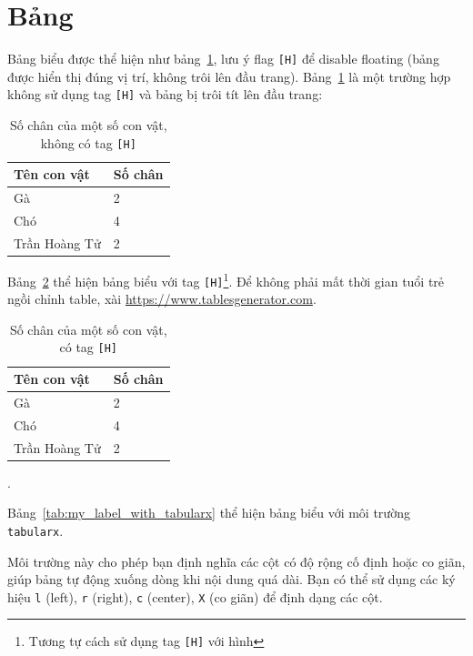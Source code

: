 \section{Bảng}
Bảng biểu được thể hiện như bảng~\ref{tab:my_label}, lưu ý flag \texttt{[H]} để disable floating (bảng được hiển thị đúng vị trí, không trôi lên đầu trang). Bảng~\ref{tab:my_label} là một trường hợp không sử dụng tag \texttt{[H]} và bảng bị trôi tít lên đầu trang:
\begin{table}[H]
	\centering
	\begin{tabular}{|l|l|}
		\hline
		\textbf{Tên con vật} & \textbf{Số chân} \\ \hline
		Gà                   & 2                \\ \hline
		Chó                  & 4                \\ \hline
		Trần Hoàng Tử        & 2                \\ \hline
	\end{tabular}
	\caption{Số chân của một số con vật, không có tag \texttt{[H]}}
	\label{tab:my_label}
\end{table}

Bảng~\ref{tab:my_label_with_H_tag} thể hiện bảng biểu với tag \texttt{[H]}\footnote{Tương tự cách sử dụng tag \texttt{[H]} với hình}. Để không phải mất thời gian tuổi trẻ ngồi chỉnh table, xài \href{https://www.tablesgenerator.com}{https://www.tablesgenerator.com}.

\begin{table}[H]
	\centering
	\begin{tabular}{|l|l|}
		\hline
		\textbf{Tên con vật} & \textbf{Số chân} \\ \hline
		Gà                   & 2                \\ \hline
		Chó                  & 4                \\ \hline
		Trần Hoàng Tử        & 2                \\ \hline
	\end{tabular}
	\caption{Số chân của một số con vật, có tag \texttt{[H]}}
	\label{tab:my_label_with_H_tag}
\end{table}.

Bảng~\ref{tab:my_label_with_tabularx} thể hiện bảng biểu với môi trường \texttt{tabularx}.

Môi trường này cho phép bạn định nghĩa các cột có độ rộng cố định hoặc co giãn, giúp bảng tự động xuống dòng khi nội dung quá dài. Bạn có thể sử dụng các ký hiệu \texttt{l} (left), \texttt{r} (right), \texttt{c} (center), \texttt{X} (co giãn) để định dạng các cột.

